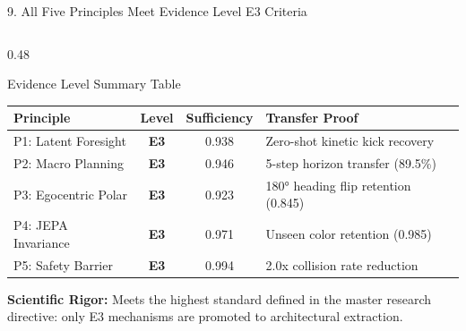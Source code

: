 \documentclass[aspectratio=169, 10pt]{beamer}
\begin{document}
\begin{frame}{9. All Five Principles Meet Evidence Level E3 Criteria}
\begin{columns}[T]
    \begin{column}{0.48\textwidth}
      \begin{block}{Evidence Level Summary Table}
        \scriptsize
        \centering
        \setlength{\tabcolsep}{2.5pt}
        \begin{tabular}{lccl}
          \toprule
          \textbf{Principle} & \textbf{Level} & \textbf{Sufficiency} & \textbf{Transfer Proof} \\
          \midrule
          P1: Latent Foresight & \textbf{E3} & 0.938 & Zero-shot kinetic kick recovery \\
          P2: Macro Planning & \textbf{E3} & 0.946 & 5-step horizon transfer (89.5\%) \\
          P3: Egocentric Polar & \textbf{E3} & 0.923 & 180° heading flip retention (0.845) \\
          P4: JEPA Invariance & \textbf{E3} & 0.971 & Unseen color retention (0.985) \\
          P5: Safety Barrier & \textbf{E3} & 0.994 & 2.0x collision rate reduction \\
          \bottomrule
        \end{tabular}
      \end{block}
      \vspace{0.05cm}
      \scriptsize \textbf{Scientific Rigor:} Meets the highest standard defined in the master research directive: only E3 mechanisms are promoted to architectural extraction.
    \end{column}
  \end{columns}
\end{frame}
\end{document}
